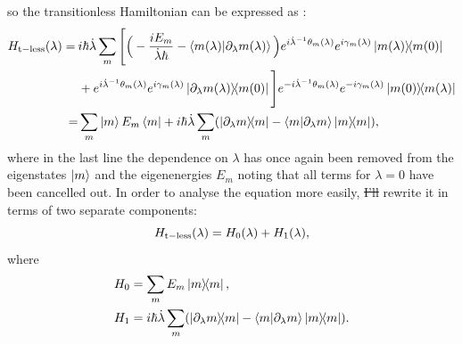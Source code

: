 \documentclass[a4paper,oneside,11pt]{book}
\newcommand{\dlambda}{\partial_{\lambda}}
\newcommand{\dotlambda}{\dot{\lambda}}
\providecommand{\DIFaddtex}[1]{{\protect\color{blue}\uwave{#1}}} %
\providecommand{\DIFdeltex}[1]{{\protect\color{red}\sout{#1}}}                      %
\providecommand{\DIFaddbegin}{} %
\providecommand{\DIFaddend}{} %
\providecommand{\DIFdelbegin}{} %
\providecommand{\DIFdelend}{} %
\providecommand{\DIFadd}[1]{\texorpdfstring{\DIFaddtex{#1}}{#1}} %
\providecommand{\DIFdel}[1]{\texorpdfstring{\DIFdeltex{#1}}{}} %
\newcommand{\DIFscaledelfig}{0.5}
\newlength{\DIFdelgraphicswidth} %
\newlength{\DIFdelgraphicsheight} %
\newcommand{\DIFaddincludegraphics}[2][]{{\color{blue}\fbox{\DIFOincludegraphics[#1]{#2}}}} %
\newcommand{\DIFdelincludegraphics}[2][]{%
\sbox{\DIFdelgraphicsbox}{\DIFOincludegraphics[#1]{#2}}%
\settoboxwidth{\DIFdelgraphicswidth}{\DIFdelgraphicsbox} %
\settoboxtotalheight{\DIFdelgraphicsheight}{\DIFdelgraphicsbox} %
\scalebox{\DIFscaledelfig}{%
\parbox[b]{\DIFdelgraphicswidth}{\usebox{\DIFdelgraphicsbox}\\[-\baselineskip] \rule{\DIFdelgraphicswidth}{0em}}\llap{\resizebox{\DIFdelgraphicswidth}{\DIFdelgraphicsheight}{%
\setlength{\unitlength}{\DIFdelgraphicswidth}%
\begin{picture}(1,1)%
\thicklines\linethickness{2pt} %
{\color[rgb]{1,0,0}\put(0,0){\framebox(1,1){}}}%
{\color[rgb]{1,0,0}\put(0,0){\line( 1,1){1}}}%
{\color[rgb]{1,0,0}\put(0,1){\line(1,-1){1}}}%
\end{picture}%
}\hspace*{3pt}}} %
} %
\DeclareRobustCommand{\DIFaddbegin}{\DIFOaddbegin \let\includegraphics\DIFaddincludegraphics} %
\DeclareRobustCommand{\DIFaddend}{\DIFOaddend \let\includegraphics\DIFOincludegraphics} %
\DeclareRobustCommand{\DIFdelbegin}{\DIFOdelbegin \let\includegraphics\DIFdelincludegraphics} %
\DeclareRobustCommand{\DIFdelend}{\DIFOaddend \let\includegraphics\DIFOincludegraphics} %
\begin{document}
    so the transitionless Hamiltonian can be expressed as \DIFaddbegin \DIFadd{(from Eq.~\eqref{eq:H_t_less})}\DIFaddend :
    \begin{equation}
        \begin{aligned}\label{eq:transitionless_hamiltonian}
            \begin{aligned}
                H_{\rm t-less}(\lambda) = \: &i \hbar \dotlambda \sum_m \Bigg[ \Big(- \frac{i E_m}{\dotlambda \hbar} - \braket{m(\lambda)}{\dlambda m(\lambda)}\Big) e^{i \dotlambda^{-1} \theta_m(\lambda)}e^{i \gamma_m(\lambda)} \dyad{m(\lambda)}{m(0)} \\
                &+ e^{i \dotlambda^{-1} \theta_m(\lambda)}e^{i \gamma_m(\lambda)} \dyad{\dlambda m(\lambda)}{m(0)} \Bigg] e^{-i \dotlambda^{-1} \theta_m(\lambda)}e^{-i \gamma_m(\lambda)} \dyad{m(0)}{m(\lambda)} \\
                 = &\sum_m \ket{m} E_m \bra{m} + i\hbar \dotlambda \sum_m (\dyad{\dlambda m}{m} - \braket{m}{\dlambda m} \dyad{m}),
            \end{aligned}
        \end{aligned}
    \end{equation}
    where in the last line the dependence on $\lambda$ has once again been removed from the eigenstates $\ket{m}$ and the eigenenergies $E_m$ noting that all terms for $\lambda = 0$ have been cancelled out. In order to analyse the equation more easily, \DIFdelbegin \DIFdel{I'll }\DIFdelend \DIFaddbegin \DIFadd{we }\DIFaddend rewrite it in terms of two separate components:
    \begin{equation}\label{eq:transitionless_h0_h1}
        H_{\rm t-less}(\lambda) = H_0(\lambda) + H_1(\lambda),
    \end{equation}
    where 
    \begin{equation}
        \begin{aligned}
            H_0 &= \sum_m E_m \dyad{m}, \\
            H_1 &= i\hbar \dotlambda \sum_m (\dyad{\dlambda m}{m} - \braket{m}{\dlambda m} \dyad{m}).
        \end{aligned}
    \end{equation}
\end{document}
